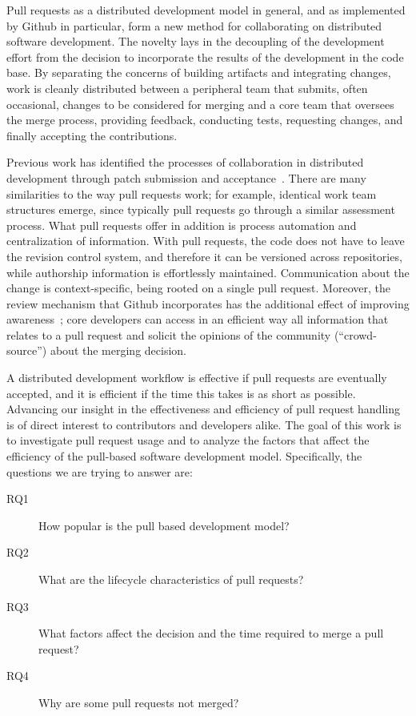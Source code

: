 \documentclass{sig-alternate}
\begin{document}
Pull requests as a distributed development model in general, and as implemented
by Github in particular, form a new method for collaborating on distributed
software development. The novelty lays in the decoupling of the development
effort from the decision to incorporate the results of the development in the
code base. By separating the concerns of building artifacts and integrating
changes, work is cleanly distributed between a peripheral team that submits, often
occasional, changes to be considered for merging and a core team that oversees
the merge process, providing feedback, conducting tests, requesting changes, and
finally accepting the contributions.

Previous work has identified the processes of collaboration in distributed
development through patch submission and acceptance~\cite{MOCKU02, Bird07,
Weiss08}. There are many similarities to the way pull requests work; for
example, identical work team structures emerge, since typically pull requests go
through a similar assessment process. What pull requests offer in addition is
process automation and centralization of information. With pull requests, the
code does not have to leave the revision control system, and therefore it can be
versioned across repositories, while authorship information is effortlessly
maintained. Communication about the change is context-specific, being rooted on
a single pull request. Moreover, the review mechanism that Github incorporates
has the additional effect of improving awareness~\cite{Dabbi12}; core developers
can access in an efficient way all information that relates to a pull request
and solicit the opinions of the community (``crowd-source'') about the merging
decision.

A distributed development workflow is effective if pull requests are eventually
accepted, and it is efficient if the time this takes is as short as possible.
Advancing our insight in the effectiveness and efficiency of pull request
handling is of direct interest to contributors and developers alike. The goal
of this work is to investigate pull request usage and to analyze the factors
that affect the efficiency of the pull-based software development model.
Specifically, the questions we are trying to answer are: 

\begin{description}
  
  \item[RQ1] How popular is the pull based development model?

  \item[RQ2] What are the lifecycle characteristics of pull requests?
    
  \item[RQ3] What factors affect the decision and the time required to merge a pull request?

  \item[RQ4] Why are some pull requests not merged?

\end{description}
\end{document}

